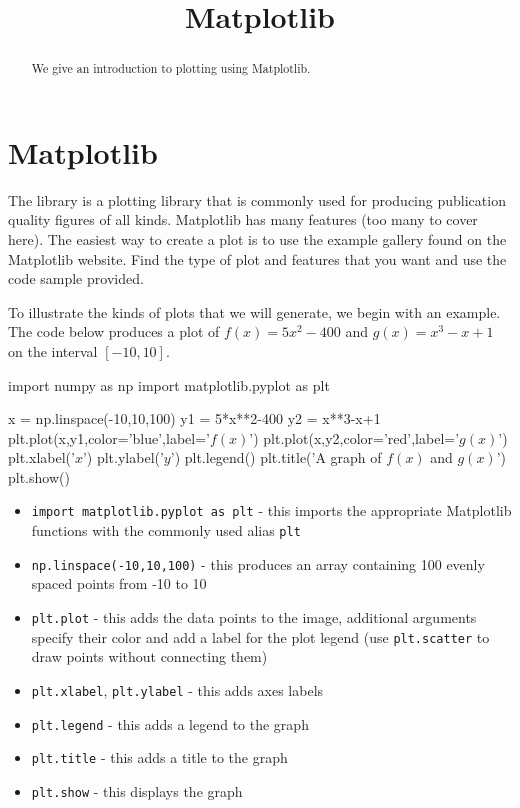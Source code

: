 \documentclass{ximera}
\title{Matplotlib}
\begin{document}
  
\begin{abstract}  
We give an introduction to plotting using Matplotlib.
\end{abstract}  
\maketitle

\section{Matplotlib}

The  library is a plotting library that is commonly used for producing publication quality figures of all kinds. Matplotlib has many features (too many to cover here). The easiest way to create a plot is to use the example gallery found on the Matplotlib website. Find the type of plot and features that you want and use the code sample provided.

To illustrate the kinds of plots that we will generate, we begin with an example. The code below produces a plot of $f(x)=5x^2-400$ and $g(x)=x^3-x+1$ on the interval $[-10,10]$. 

\begin{sageCell}
import numpy as np
import matplotlib.pyplot as plt

x = np.linspace(-10,10,100)
y1 = 5*x**2-400
y2 = x**3-x+1
plt.plot(x,y1,color='blue',label='$f(x)$')
plt.plot(x,y2,color='red',label='$g(x)$')
plt.xlabel('$x$')
plt.ylabel('$y$')
plt.legend()
plt.title('A graph of $f(x)$ and $g(x)$')
plt.show()
\end{sageCell}



\begin{itemize}
	\item \verb|import matplotlib.pyplot as plt| - this imports the appropriate Matplotlib functions with the commonly used alias \verb|plt|
	\item \verb|np.linspace(-10,10,100)| - this produces an array containing 100 evenly spaced points from -10 to 10
	\item \verb|plt.plot| - this adds the data points to the image, additional arguments specify their color and add a label for the plot legend (use \verb|plt.scatter| to draw points without connecting them)
	\item \verb|plt.xlabel|, \verb|plt.ylabel| - this adds axes labels
	\item \verb|plt.legend| - this adds a legend to the graph
	\item \verb|plt.title| - this adds a title to the graph
	\item \verb|plt.show| - this displays the graph
\end{itemize}
\end{document}
